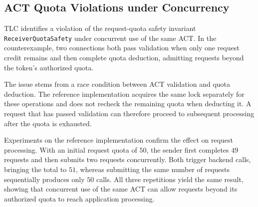 \subsection{ACT Quota Violations under Concurrency}
\label{subsec:act-concurrent-quota}

TLC identifies a violation of the request-quota safety invariant \texttt{ReceiverQuotaSafety} under concurrent use of the same ACT. In the counterexample, two connections both pass validation when only one request credit remains and then complete quota deduction, admitting requests beyond the token's authorized quota.

The issue stems from a race condition between ACT validation and quota deduction. The reference implementation acquires the same lock separately for these operations and does not recheck the remaining quota when deducting it. A request that has passed validation can therefore proceed to subsequent processing after the quota is exhausted.

Experiments on the reference implementation confirm the effect on request processing. With an initial request quota of $50$, the sender first completes $49$ requests and then submits two requests concurrently. Both trigger backend calls, bringing the total to $51$, whereas submitting the same number of requests sequentially produces only $50$ calls. All three repetitions yield the same result, showing that concurrent use of the same ACT can allow requests beyond its authorized quota to reach application processing.
